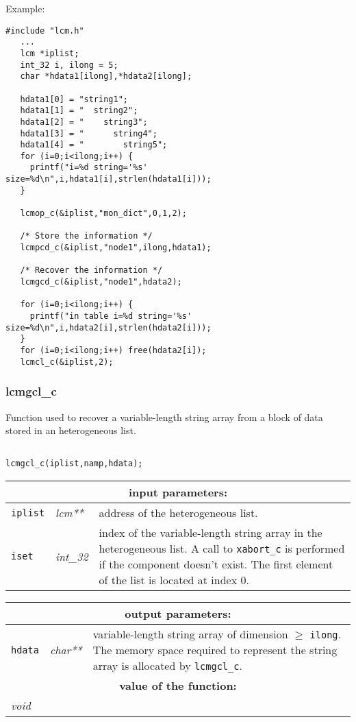 \vskip 0.4cm

\noindent Example:
\begin{verbatim}
#include "lcm.h"
   ...
   lcm *iplist;
   int_32 i, ilong = 5;
   char *hdata1[ilong],*hdata2[ilong];

   hdata1[0] = "string1";
   hdata1[1] = "  string2";
   hdata1[2] = "    string3";
   hdata1[3] = "      string4";
   hdata1[4] = "        string5";
   for (i=0;i<ilong;i++) {
     printf("i=%d string='%s' size=%d\n",i,hdata1[i],strlen(hdata1[i]));
   }

   lcmop_c(&iplist,"mon_dict",0,1,2);

   /* Store the information */
   lcmpcd_c(&iplist,"node1",ilong,hdata1);

   /* Recover the information */
   lcmgcd_c(&iplist,"node1",hdata2);

   for (i=0;i<ilong;i++) {
     printf("in table i=%d string='%s' size=%d\n",i,hdata2[i],strlen(hdata2[i]));
   }
   for (i=0;i<ilong;i++) free(hdata2[i]);
   lcmcl_c(&iplist,2);
\end{verbatim}

\subsubsection{lcmgcl\_c}\label{sect:lcmgclc}

Function used to recover a variable-length string array from a block of data stored in an heterogeneous list.

\begin{verbatim}

lcmgcl_c(iplist,namp,hdata);
\end{verbatim}

\noindent
\begin{tabular}{|p{1.5cm}|p{2cm}|p{11cm}|}
\hline
\multicolumn{3}{|c|}{\bf input parameters:} \\
\hline
{\tt iplist} & {\it lcm**} & address of the heterogeneous list. \\
\hline
{\tt iset} & {\it int\_32} & index of the variable-length string array in the heterogeneous list. A call to {\tt xabort\_c} is performed if the component doesn't exist.
The first element of the list is located at index $0$. \\
\hline
\end{tabular}

\vskip 0.8cm

\noindent
\begin{tabular}{|p{1.5cm}|p{2cm}|p{11cm}|}
\hline
\multicolumn{3}{|c|}{\bf output parameters:} \\
\hline
{\tt hdata} & {\it char**} & variable-length string array of dimension $\ge$ {\tt ilong}. The memory space required to represent the string array is allocated by {\tt lcmgcl\_c}.\\
\hline
\multicolumn{3}{|c|}{\bf value of the function:} \\
\hline
\multicolumn{2}{|l|}{\it void} &  \\
\hline
\end{tabular}

